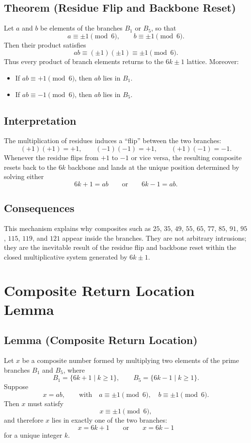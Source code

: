 \documentclass[12pt]{article}
\begin{document}
\subsection*{Theorem (Residue Flip and Backbone Reset)}
Let $a$ and $b$ be elements of the branches $B_1$ or $B_5$, so that
\[
a \equiv \pm 1 \pmod{6}, \qquad b \equiv \pm 1 \pmod{6}.
\]
Then their product satisfies
\[
ab \equiv (\pm 1)(\pm 1) \equiv \pm 1 \pmod{6}.
\]
Thus every product of branch elements returns to the $6k \pm 1$ lattice.
Moreover:
\begin{itemize}
\item If $ab \equiv +1 \pmod{6}$, then $ab$ lies in $B_1$.
\item If $ab \equiv -1 \pmod{6}$, then $ab$ lies in $B_5$.
\end{itemize}

\subsection*{Interpretation}
The multiplication of residues induces a ``flip'' between the two branches:
\[
(+1)(+1) = +1, \qquad (-1)(-1) = +1, \qquad (+1)(-1) = -1.
\]
Whenever the residue flips from $+1$ to $-1$ or vice versa, the resulting
composite resets back to the $6k$ backbone and lands at the unique position
determined by solving either
\[
6k+1 = ab \qquad \text{or} \qquad 6k-1 = ab.
\]

\subsection*{Consequences}
This mechanism explains why composites such as $25$, $35$, $49$, $55$, $65$,
$77$, $85$, $91$, $95$, $115$, $119$, and $121$ appear inside the branches.
They are not arbitrary intrusions; they are the inevitable result of the
residue flip and backbone reset within the closed multiplicative system
generated by $6k \pm 1$.

\section{Composite Return Location Lemma}

\subsection*{Lemma (Composite Return Location)}
Let $x$ be a composite number formed by multiplying two elements of the prime
branches $B_1$ and $B_5$, where
\[
B_1 = \{6k+1 \mid k \geq 1\}, \qquad B_5 = \{6k-1 \mid k \geq 1\}.
\]
Suppose
\[
x = ab, \qquad \text{with} \quad a \equiv \pm 1 \pmod{6}, \quad b \equiv \pm 1 \pmod{6}.
\]
Then $x$ must satisfy
\[
x \equiv \pm 1 \pmod{6},
\]
and therefore $x$ lies in exactly one of the two branches:
\[
x = 6k+1 \qquad \text{or} \qquad x = 6k-1
\]
for a unique integer $k$.
\end{document}
